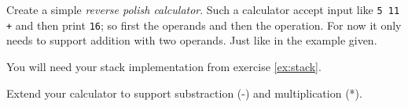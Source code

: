 \begin{Exercise}[title={Slice diff},difficulty=7]
\label{ex:slicediff}
\Question \label{ex:calc q1} Create a simple \emph{reverse polish calculator}. Such a calculator
accept input like \texttt{5 11 +} and then print \texttt{16}; so first the operands and then the
operation. For now it only needs to support addition with two operands. Just like in the
example given.

You will need your stack implementation from exercise \ref{ex:stack}.

\Question \label{ex:calc q2} Extend your calculator to support substraction (-) and multiplication (*).
\end{Exercise}

\begin{Answer}

\Question

\Question

\end{Answer}
